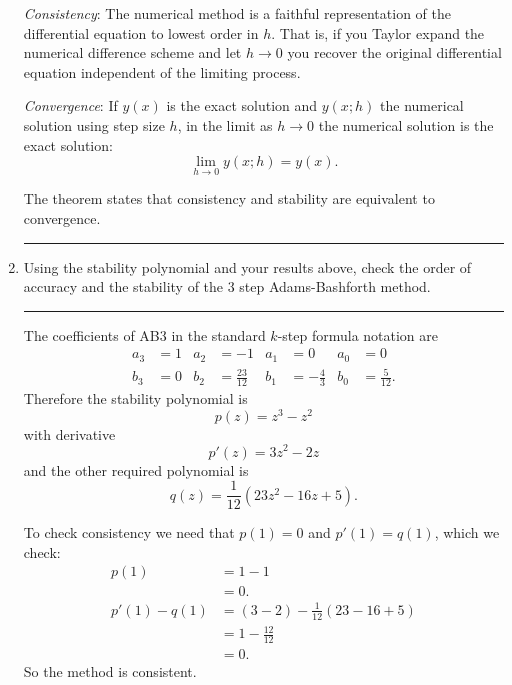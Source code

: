 \documentclass[10pt]{article}
\begin{document}
\begin{enumerate}
  \emph{Consistency}: The numerical method is a faithful
  representation of the differential equation to lowest order in $h$.
  That is, if you Taylor expand the numerical difference scheme and
  let $h \rightarrow 0$ you recover the original differential equation
  independent of the limiting process.

  \emph{Convergence}: If $y(x)$ is the exact solution and $y(x;h)$ the
  numerical solution using step size $h$, in the limit as $h
  \rightarrow 0$ the numerical solution is the exact solution:
  \begin{equation*}
    \lim_{h \rightarrow 0} y(x;h) = y(x).
  \end{equation*}

  The theorem states that consistency and stability are equivalent to
  convergence. 
  \begin{center}
    \rule{0.9\textwidth}{.1pt}
  \end{center}
\item Using the stability polynomial and your results above, check the
  order of accuracy and the stability of the 3 step Adams-Bashforth
  method. 
  \begin{center}
    \rule{0.9\textwidth}{.1pt}
  \end{center}
  The coefficients of AB3 in the standard $k$-step formula notation are
  \begin{align*}
    a_3 & = 1 & a_2 & = -1 & a_1 & = 0 & a_0 & = 0 \\
    b_3 & = 0 & b_2 & = \frac{23}{12} & b_1 & = -\frac{4}{3} & b_0 & =
    \frac{5}{12}.
  \end{align*}
  Therefore the stability polynomial is
  \begin{equation*}
    p(z) = z^3 - z^2
  \end{equation*}
  with derivative
  \begin{equation*}
    p'(z) = 3 z^2 - 2 z
  \end{equation*}
  and the other required polynomial is
  \begin{equation*}
    q(z) = \frac{1}{12} \left( 23 z^2 - 16 z + 5 \right).
  \end{equation*}
  
  To check consistency we need that $p(1) = 0$ and $p'(1) = q(1)$,
  which we check:
  \begin{align*}
    p(1) & = 1 - 1 \\
    & = 0. \\
    p'(1) - q(1) & = (3 - 2) - \frac{1}{12} \left( 23 - 16 + 5 \right)
    \\
    & = 1 - \frac{12}{12} \\
    & = 0.
  \end{align*}
  So the method is consistent.


\end{enumerate}
\end{document}
